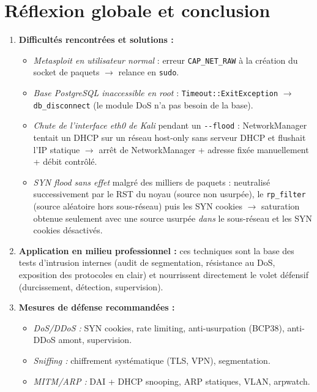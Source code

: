 \documentclass[11pt,a4paper]{article}
\begin{document}
\section{Réflexion globale et conclusion}
\begin{enumerate}[leftmargin=1.6em]
  \item \textbf{Difficultés rencontrées et solutions :}
  \begin{itemize}[leftmargin=1.2em]
    \item \emph{Metasploit en utilisateur normal} : erreur \texttt{CAP\_NET\_RAW} à la création
          du socket de paquets $\rightarrow$ relance en \texttt{sudo}.
    \item \emph{Base PostgreSQL inaccessible en root} : \texttt{Timeout::ExitException}
          $\rightarrow$ \texttt{db\_disconnect} (le module DoS n'a pas besoin de la base).
    \item \emph{Chute de l'interface eth0 de Kali} pendant un \texttt{-{}-flood} : NetworkManager
          tentait un DHCP sur un réseau host-only sans serveur DHCP et flushait l'IP statique
          $\rightarrow$ arrêt de NetworkManager + adresse fixée manuellement + débit contrôlé.
    \item \emph{SYN flood sans effet} malgré des milliers de paquets : neutralisé
          successivement par le RST du noyau (source non usurpée), le \texttt{rp\_filter}
          (source aléatoire hors sous-réseau) puis les SYN cookies $\rightarrow$ saturation
          obtenue seulement avec une source usurpée \emph{dans} le sous-réseau et les SYN
          cookies désactivés.
  \end{itemize}

  \item \textbf{Application en milieu professionnel :} ces techniques sont la base des tests
        d'intrusion internes (audit de segmentation, résistance au DoS, exposition des
        protocoles en clair) et nourrissent directement le volet défensif (durcissement,
        détection, supervision).

  \item \textbf{Mesures de défense recommandées :}
  \begin{itemize}[leftmargin=1.2em]
    \item \emph{DoS/DDoS :} SYN cookies, rate limiting, anti-usurpation (BCP38), anti-DDoS amont, supervision.
    \item \emph{Sniffing :} chiffrement systématique (TLS, VPN), segmentation.
    \item \emph{MITM/ARP :} DAI + DHCP snooping, ARP statiques, VLAN, arpwatch.
  \end{itemize}


\end{enumerate}
\end{document}
